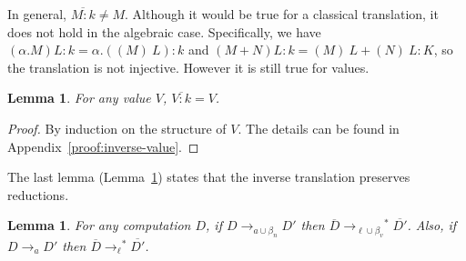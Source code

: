 \documentclass{LMCS}
\newtheorem{lemma}[theorem]{Lemma}
\newcommand{\App}[1]{The details can be found in Appendix~\ref{proof:#1}}
\newcommand{\xto}[1]{\ensuremath{\rightarrow_{#1}}}
\newcommand{\toalgred}{\xto{a}}
\newcommand{\stolinred}{\ensuremath{\xto{\ell}^{\ast}}}
\newcommand{\tobalgred}{\xto{a\cup\beta_n}}
\newcommand{\stoblinred}{\ensuremath{\xto{\ell\cup\beta_v}^{\ast}}}
\begin{document}
In general, $\overline{M:k}\neq M$. Although it would be true for
a classical translation, it does not hold in the algebraic case. Specifically,
we have $(\alpha.M)L:k=\alpha.((M)~L):k$ and $(M+N)L:k=(M)~L+(N)~L:K$, so
the translation is not injective. However it is still true for values.

\begin{lemma}
  \label{lem:inverse-value} For any value $V$, $\overline{V:k}=V$.
\end{lemma}
\begin{proof}
  By induction on the structure of $V$. \App{inverse-value}.
\end{proof}

The last lemma (Lemma~\ref{lem:inverse-step}) states that the inverse translation preserves reductions.


\begin{lemma}
  \label{lem:inverse-step} For any computation $D$, if $D\tobalgred D'$
  then $\overline{D}\stoblinred\overline{D'}$. Also, if $D\toalgred D'$
  then $\overline{D}\stolinred\overline{D'}$.
\end{lemma}
\end{document}
